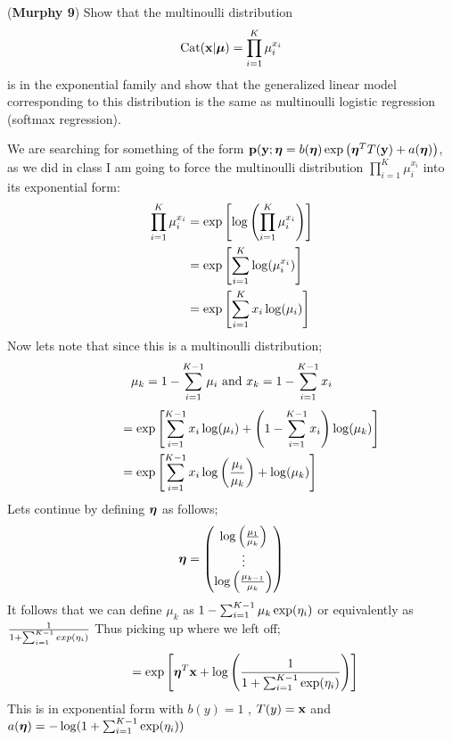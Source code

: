 \documentclass[12pt,letterpaper,fleqn]{hmcpset}
\begin{document}
\begin{problem}[2]
(\textbf{Murphy 9}) Show that the multinoulli distribution
\[
    \text{Cat}({\bf x}|\hbox{\boldmath$\mu$}) = \prod_{i=1}^K \mu_i^{x_i}
\]
is in the exponential family and show that the generalized linear model
corresponding to this distribution is the same as multinoulli logistic
regression (softmax regression).
\end{problem}
\begin{solution}
We are searching for something of the form ${\bf p}({\bf y};\boldsymbol{\eta}=b(\boldsymbol{\eta})\exp \left(\boldsymbol{\eta}^TT({\bf y})+a(\boldsymbol{\eta})\right)$, as we did in class I am going to force the multinoulli distribution $\prod_{i=1}^K \mu_i^{x_i}$ into its exponential form:
\begin{align}
\prod_{i=1}^K \mu_i^{x_i} &= \exp\left[\log\left(\prod_{i=1}^K \mu_i^{x_i}\right)\right]\\
&=\exp\left[\sum_{i=1}^K\log(\mu_i^{x_i})\right]\\
&= \exp \left[\sum_{i=1}^K x_i\log(\mu_i)\right]
\end{align}
Now lets note that since this is a multinoulli distribution; 
$$\mu_k = 1-\sum_{i=1}^{K-1}\mu_i \text{ and } x_k = 1- \sum_{i=1}^{K-1} x_i$$
\begin{align}
\phantom{\prod_{i=1}^K \mu_i^{x_i} }&= \exp\left[\sumkL x_i\log(\mu_i)+\left(1-\sumkL x_i\right)\log (\mu_k)\right]\\
&=\exp\left[\sumkL x_i \log\left(\frac{\mu_i}{\mu_k}\right)+\log (\mu_k)\right]
\end{align}
Lets continue by defining $\boldsymbol{\eta}$ as follows; 
$$ \boldsymbol{\eta} = \begin{pmatrix}
\log\left( \frac{\mu_1}{\mu_k}\right)\\
\vdots\\
\log\left( \frac{\mu_{k-1}}{\mu_k}\right)
\end{pmatrix}
$$
It follows that we can define $\mu_k$ as $1-\sum_{i=1}^{K-1}\mu_k\exp(\eta_i) $ or equivalently as $ \frac{1}{1 +\sum_{i=1}^{K-1} exp(\eta_i)} $
Thus picking up where we left off; 
\begin{align}
\phantom{\prod_{i=1}^K \mu_i^{x_i} }&= \exp\left[\eeta^T\xx + \log\left(\frac{1}{1 +\sumkL \exp(\eta_i)}\right)\right]
\end{align}
This is in exponential form with $b(y)  =1 $ , $T(y) = {\bf x}$ and $a(\boldsymbol{\eta}) = -\log( 1 +\sum_{i=1}^{K-1} \exp(\eta_i))$
\end{solution}
\newpage
\end{document}
